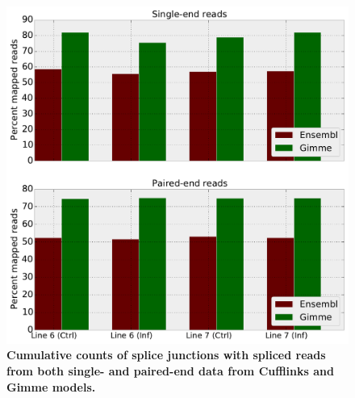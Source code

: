 \documentclass[10pt]{article}
\begin{document}
% 

\begin{figure}[!ht]
\begin{center}
\includegraphics[width=5in]{mapped-reads.pdf}
\end{center}
\caption{
{\bf Cumulative counts of splice junctions with spliced reads from both single-
and paired-end data from Cufflinks and Gimme models.}
}
\label{mapped-reads}
\end{figure}
\end{document}
